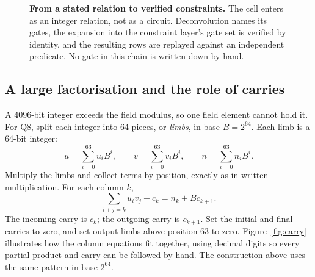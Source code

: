 \documentclass[11pt,a4paper]{article}
\begin{document}
\begin{figure}[htbp]
\centering
{}
\caption{\textbf{From a stated relation to verified constraints.} The cell
enters as an integer relation, not as a circuit. Deconvolution names its gates,
the expansion into the constraint layer's gate set is verified by identity, and
the resulting rows are replayed against an independent predicate. No gate in
this chain is written down by hand.}
\label{fig:causalbool-route}
\end{figure}

\subsection{A large factorisation and the role of carries}
\label{sec:q8}
A 4096-bit integer exceeds the field modulus, so one field element cannot
hold it. For Q8, split each integer into 64 pieces, or \emph{limbs}, in
base $B=2^{64}$. Each limb is a 64-bit integer:
\begin{equation}
u=\sum_{i=0}^{63}u_iB^i,\qquad
v=\sum_{i=0}^{63}v_iB^i,\qquad
n=\sum_{i=0}^{63}n_iB^i.
\end{equation}
Multiply the limbs and collect terms by position, exactly as in written
multiplication. For each column $k$,
\begin{equation}\label{eq:carry}
\sum_{i+j=k}u_i v_j+c_k=n_k+Bc_{k+1}.
\end{equation}
The incoming carry is $c_k$; the outgoing carry is $c_{k+1}$. Set the
initial and final carries to zero, and set output limbs above position
63 to zero. Figure~\ref{fig:carry} illustrates how the column equations
fit together, using decimal digits so every partial product and carry
can be followed by hand. The construction above uses the same pattern
in base $2^{64}$.
\end{document}
